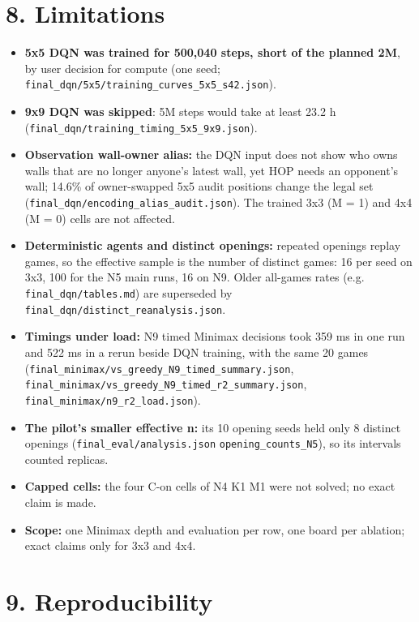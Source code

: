 \documentclass[11pt]{article}
\begin{document}
\section{8. Limitations}

\begin{itemize}
\item \textbf{5x5 DQN was trained for 500,040 steps, short of the planned 2M}, by user decision for
compute (one seed; \texttt{final\_dqn/5x5/training\_curves\_5x5\_s42.json}).
\item \textbf{9x9 DQN was skipped}: 5M steps would take at least 23.2 h
(\texttt{final\_dqn/training\_timing\_5x5\_9x9.json}).
\item \textbf{Observation wall-owner alias:} the DQN input does not show who owns walls that are no longer
anyone's latest wall, yet HOP needs an opponent's wall; 14.6\% of owner-swapped 5x5 audit
positions change the legal set (\texttt{final\_dqn/encoding\_alias\_audit.json}). The trained 3x3 (M = 1)
and 4x4 (M = 0) cells are not affected.
\item \textbf{Deterministic agents and distinct openings:} repeated openings replay games, so the
effective sample is the number of distinct games: 16 per seed on 3x3, 100 for the N5 main runs,
16 on N9. Older all-games rates (e.g. \texttt{final\_dqn/tables.md}) are superseded by
\texttt{final\_dqn/distinct\_reanalysis.json}.
\item \textbf{Timings under load:} N9 timed Minimax decisions took 359 ms in one run and 522 ms in a rerun
beside DQN training, with the same 20 games (\texttt{final\_minimax/vs\_greedy\_N9\_timed\_summary.json},
\texttt{final\_minimax/vs\_greedy\_N9\_timed\_r2\_summary.json}, \texttt{final\_minimax/n9\_r2\_load.json}).
\item \textbf{The pilot's smaller effective n:} its 10 opening seeds held only 8 distinct openings
(\texttt{final\_eval/analysis.json} \texttt{opening\_counts\_N5}), so its intervals counted replicas.
\item \textbf{Capped cells:} the four C-on cells of N4 K1 M1 were not solved; no exact claim is made.
\item \textbf{Scope:} one Minimax depth and evaluation per row, one board per ablation; exact claims only
for 3x3 and 4x4.
\end{itemize}

\section{9. Reproducibility}
\end{document}
